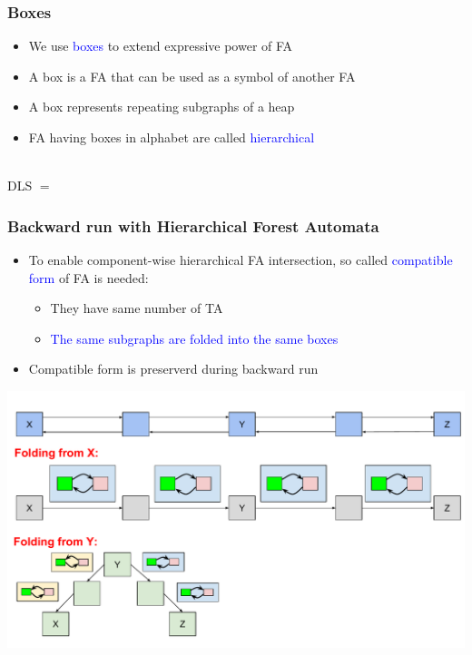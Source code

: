 \documentclass{beamer}
\newcommand{\hlbl}[1]{\textcolor{blue}{#1}}
\begin{document}
\begin{frame}
\frametitle{Boxes}

\begin{itemize}
		\item We use \hlbl{boxes} to extend expressive power of FA
		\item A box is a FA that can be used as a symbol of another FA
		\item A box represents repeating subgraphs of a heap
		\item FA having boxes in alphabet are called \hlbl{hierarchical}
	\end{itemize}
		\vspace{-0.8cm}
		\centering \\
		\vspace{0.7cm}
		\centering DLS $=$ \\
		\vspace{-0.8cm}
		\centering 
\end{frame}



\begin{frame}
\frametitle{Backward run with Hierarchical Forest Automata}
	
		   	\begin{itemize}
				\item To enable component-wise hierarchical FA intersection,
					so called \hlbl{compatible form} of FA is needed:
				\begin{itemize}
					\item They have same number of TA
					\item \hlbl{The same subgraphs are folded into the same boxes}
				\end{itemize}
				\item Compatible form is preserverd during backward run
			\end{itemize}

	\begin{center}
		\includegraphics[scale=0.4]{ex/cp.pdf}
	\end{center}

\end{frame}
\end{document}
